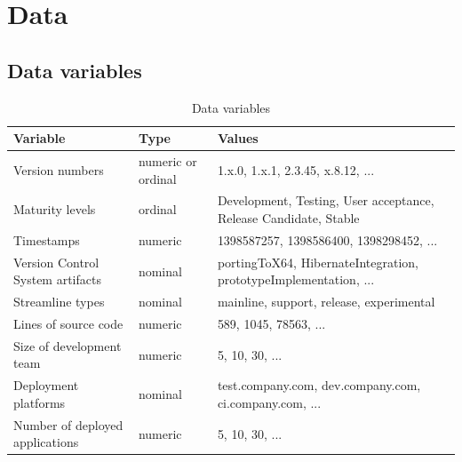 \documentclass[journal]{vgtc}                %
\begin{document}
\section{Data}
\subsection{Data variables}

\begin{table}[H]
 \scriptsize
 \begin{center}
   \begin{tabular}{|l|p{1cm}|p{3cm}|} 
   \hline
     \textbf{Variable} & \textbf{Type} & \textbf{Values} \\
   \hline
   \hline
     Version numbers  & numeric or ordinal & 1.x.0, 1.x.1, 2.3.45, x.8.12, ... \\ \hline  
     Maturity levels & ordinal & Development, Testing, User acceptance, Release Candidate, Stable \\ \hline  
     Timestamps & numeric & 1398587257, 1398586400, 1398298452, ... \\ \hline  
     Version Control System artifacts & nominal & portingToX64, HibernateIntegration, prototypeImplementation, ... \\ \hline  
     Streamline types & nominal & mainline, support, release, experimental \\ \hline  
     Lines of source code & numeric & 589, 1045, 78563, ... \\ \hline  
     Size of development team & numeric & 5, 10, 30, ... \\ \hline  
     Deployment platforms & nominal & test.company.com, dev.company.com, ci.company.com, ... \\ \hline  
     Number of deployed applications & numeric & 5, 10, 30, ... \\ \hline  
     
   \end{tabular}
   \caption{Data variables}
   \label{data_variables}
\end{center}
\end{table}

\end{document}
